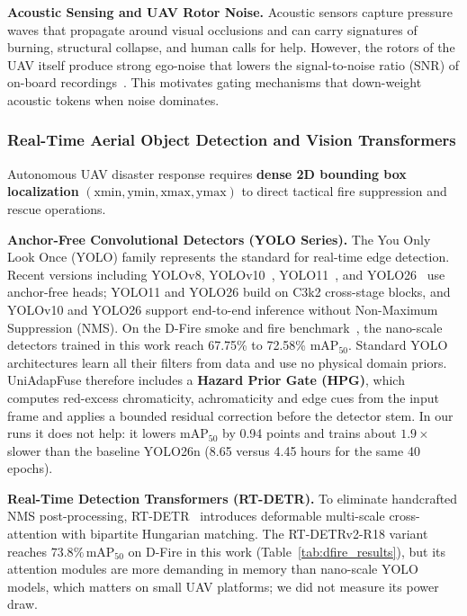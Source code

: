 \documentclass[journal]{IEEEtran}
\begin{document}
\textbf{Acoustic Sensing and UAV Rotor Noise.}
Acoustic sensors capture pressure waves that propagate around visual occlusions and can carry signatures of burning, structural collapse, and human calls for help. However, the rotors of the UAV itself produce strong ego-noise that lowers the signal-to-noise ratio (SNR) of on-board recordings~\cite{gupta2025droneaudioset}. This motivates gating mechanisms that down-weight acoustic tokens when noise dominates.

\subsubsection{Real-Time Aerial Object Detection and Vision Transformers}

Autonomous UAV disaster response requires \textbf{dense 2D bounding box localization} $(\text{xmin}, \text{ymin}, \text{xmax}, \text{ymax})$ to direct tactical fire suppression and rescue operations.

\textbf{Anchor-Free Convolutional Detectors (YOLO Series).}
The You Only Look Once (YOLO) family represents the standard for real-time edge detection. Recent versions including YOLOv8, YOLOv10~\cite{wang2024yolov10}, YOLO11~\cite{ultralytics2024yolo11}, and YOLO26~\cite{sapkota2025yolo26} use anchor-free heads; YOLO11 and YOLO26 build on C3k2 cross-stage blocks, and YOLOv10 and YOLO26 support end-to-end inference without Non-Maximum Suppression (NMS). On the D-Fire smoke and fire benchmark~\cite{dfire2022}, the nano-scale detectors trained in this work reach 67.75\% to 72.58\% $\text{mAP}_{50}$. Standard YOLO architectures learn all their filters from data and use no physical domain priors. UniAdapFuse therefore includes a \textbf{Hazard Prior Gate (HPG)}, which computes red-excess chromaticity, achromaticity and edge cues from the input frame and applies a bounded residual correction before the detector stem. In our runs it does not help: it lowers $\mathrm{mAP}_{50}$ by 0.94 points and trains about $1.9\times$ slower than the baseline YOLO26n (8.65 versus 4.45 hours for the same 40 epochs).

\textbf{Real-Time Detection Transformers (RT-DETR).}
To eliminate handcrafted NMS post-processing, RT-DETR~\cite{zhao2024rtdetr} introduces deformable multi-scale cross-attention with bipartite Hungarian matching. The RT-DETRv2-R18 variant reaches $73.8\%\, \text{mAP}_{50}$ on D-Fire in this work (Table~\ref{tab:dfire_results}), but its attention modules are more demanding in memory than nano-scale YOLO models, which matters on small UAV platforms; we did not measure its power draw.
\end{document}
